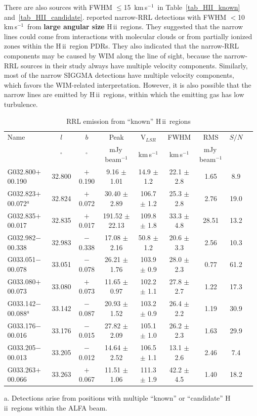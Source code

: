 \documentclass[manuscript]{aastex61}
\newcommand{\hii}{{\rm H\,}{{\sc ii}}}
\newcommand{\kms}{\,km\,s$^{-1}$}
\begin{document}
There are also sources with FWHM $\leq$15 \kms\ in Table~\ref{tab_HII_known} and~\ref{tab_HII_candidate}.
\citet{Anderson2018} reported narrow-RRL detections with FWHM $<$10 \kms\ from \textbf{large angular size} \hii\ regions.
They suggested that the narrow lines could come from interactions with molecular clouds or from partially ionized zones within the \hii\ region PDRs.
They also indicated that the narrow-RRL components may be caused by WIM along the line of sight, because the narrow-RRL sources in their study always have multiple velocity components.
Similarly, most of the narrow SIGGMA detections have multiple velocity components, which favors the WIM-related interpretation.
However, it is also possible that the narrow lines are emitted by \hii\ regions, within which the emitting gas has low turbulence.

\begin{table}[htbp]
\centering
\caption{RRL emission from ``known'' \hii\ regions}\label{tab_hii_k_sample}
\begin{threeparttable}
\begin{tabular*}{\textwidth}{l@{\extracolsep{\fill}}*{8}{c}}
\hline
\hline
Name & $l$ & $b$ & Peak& V$_{LSR}$& FWHM& RMS& $S/N$\\
&$^\circ$&$^\circ$&mJy\,beam$^{-1}$&km\,s$^{-1}$&km\,s$^{-1}$&mJy\,beam$^{-1}$& \\
\hline
G032.800$+$00.190     &32.800&	$+$0.190	&9.16	$\pm$ 1.01	&14.9	$\pm$ 1.2	&22.1	$\pm$ 2.8	&1.65	&8.9 \\ 
G032.823$+$00.072$^a$ &32.824&	$+$0.072	&30.40	$\pm$ 2.89	&106.7	$\pm$ 1.2	&25.3	$\pm$ 2.8	&2.76	&19.0\\
G032.835$+$00.017     &32.835&	$+$0.017	&191.52	$\pm$ 22.13	&109.8	$\pm$ 1.8	&33.3	$\pm$ 4.8	&28.51	&13.2\\
G032.982$-$00.338     &32.983&	$-$0.338	&17.08	$\pm$ 2.16	&50.8	$\pm$ 1.2	&20.6	$\pm$ 3.3	&2.56	&10.3\\
G033.051$-$00.078     &33.051&	$-$0.078	&26.21	$\pm$ 1.76	&103.9	$\pm$ 0.9	&28.0	$\pm$ 2.3	&0.77	&61.2\\
G033.080$+$00.073     &33.080&	$+$0.073	&11.65	$\pm$ 0.97	&102.2	$\pm$ 1.1	&27.8	$\pm$ 2.7	&1.22	&17.3\\
G033.142$-$00.088$^a$ &33.142&	$-$0.087	&20.93	$\pm$ 1.52	&103.2	$\pm$ 0.9	&26.4	$\pm$ 2.2	&1.19	&30.9\\
G033.176$-$00.016     &33.176&	$-$0.015	&27.82	$\pm$ 2.09	&105.1	$\pm$ 1.0	&26.2	$\pm$ 2.3	&1.63	&29.9\\
G033.205$-$00.013     &33.205&	$-$0.012	&14.64	$\pm$ 2.52	&106.5	$\pm$ 1.1	&13.1	$\pm$ 2.6	&2.46	&7.4\\
G033.263$+$00.066     &33.263&	$+$0.067	&11.51	$\pm$ 1.06	&111.3	$\pm$ 1.9	&42.2	$\pm$ 4.5	&1.40	&18.2\\
\hline
\end{tabular*}
\begin{tablenotes}
      \small
      \item a. Detections arise from positions with multiple ``known'' or ``candidate'' \hii\ regions within the ALFA beam.
\end{tablenotes}
\end{threeparttable}
\end{table}
\end{document}
